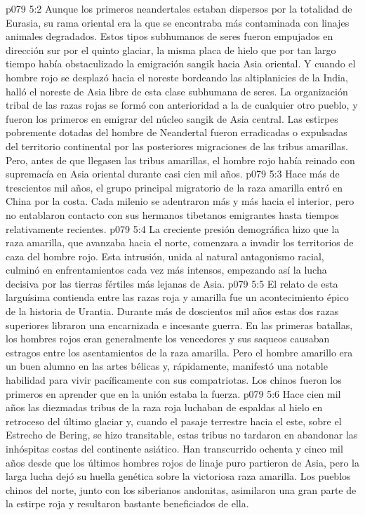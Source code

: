 \vs p079 5:2 Aunque los primeros neandertales estaban dispersos por la totalidad de Eurasia, su rama oriental era la que se encontraba más contaminada con linajes animales degradados. Estos tipos subhumanos de seres fueron empujados en dirección sur por el quinto glaciar, la misma placa de hielo que por tan largo tiempo había obstaculizado la emigración sangik hacia Asia oriental. Y cuando el hombre rojo se desplazó hacia el noreste bordeando las altiplanicies de la India, halló el noreste de Asia libre de esta clase subhumana de seres. La organización tribal de las razas rojas se formó con anterioridad a la de cualquier otro pueblo, y fueron los primeros en emigrar del núcleo sangik de Asia central. Las estirpes pobremente dotadas del hombre de Neandertal fueron erradicadas o expulsadas del territorio continental por las posteriores migraciones de las tribus amarillas. Pero, antes de que llegasen las tribus amarillas, el hombre rojo había reinado con supremacía en Asia oriental durante casi cien mil años.
\vs p079 5:3 \pc Hace más de trescientos mil años, el grupo principal migratorio de la raza amarilla entró en China por la costa. Cada milenio se adentraron más y más hacia el interior, pero no entablaron contacto con sus hermanos tibetanos emigrantes hasta tiempos relativamente recientes.
\vs p079 5:4 La creciente presión demográfica hizo que la raza amarilla, que avanzaba hacia el norte, comenzara a invadir los territorios de caza del hombre rojo. Esta intrusión, unida al natural antagonismo racial, culminó en enfrentamientos cada vez más intensos, empezando así la lucha decisiva por las tierras fértiles más lejanas de Asia.
\vs p079 5:5 El relato de esta larguísima contienda entre las razas roja y amarilla fue un acontecimiento épico de la historia de Urantia. Durante más de doscientos mil años estas dos razas superiores libraron una encarnizada e incesante guerra. En las primeras batallas, los hombres rojos eran generalmente los vencedores y sus saqueos causaban estragos entre los asentamientos de la raza amarilla. Pero el hombre amarillo era un buen alumno en las artes bélicas y, rápidamente, manifestó una notable habilidad para vivir pacíficamente con sus compatriotas. Los chinos fueron los primeros en aprender que en la unión estaba la fuerza.
\vs p079 5:6 \pc Hace cien mil años las diezmadas tribus de la raza roja luchaban de espaldas al hielo en retroceso del último glaciar y, cuando el pasaje terrestre hacia el este, sobre el Estrecho de Bering, se hizo transitable, estas tribus no tardaron en abandonar las inhóspitas costas del continente asiático. Han transcurrido ochenta y cinco mil años desde que los últimos hombres rojos de linaje puro partieron de Asia, pero la larga lucha dejó su huella genética sobre la victoriosa raza amarilla. Los pueblos chinos del norte, junto con los siberianos andonitas, asimilaron una gran parte de la estirpe roja y resultaron bastante beneficiados de ella.
